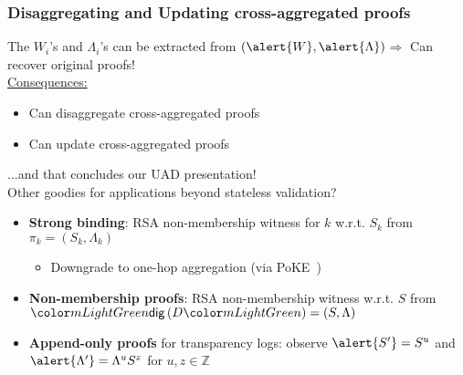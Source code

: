 \begin{frame}
    \frametitle{Disaggregating and Updating cross-aggregated proofs}
    The $W_i$'s and $\Lambda_i$'s can be extracted from $(\alert{W},\alert{\Lambda})$\pause\xspace $\Rightarrow$ Can recover original proofs!\pause\\
    \vspace{1em}
    \underline{Consequences:}\pause
    \begin{itemize}
        \item Can disaggregate cross-aggregated proofs\pause
        \item Can update cross-aggregated proofs\pause
    \end{itemize}
    ...and that concludes our UAD presentation!\pause\\
    \vspace{1em}
    \alert{Other goodies} for applications beyond stateless validation?\pause
    \begin{itemize}
        \item \textbf{Strong binding}\pause: RSA non-membership witness for $k$ w.r.t. $S_k$ from $\pi_k=(S_k, \Lambda_k)$\pause
        \begin{itemize}
            \item Downgrade to one-hop aggregation (via \alert{PoKE}~\cite{BBF18})\pause
        \end{itemize}
        \item \textbf{Non-membership proofs}\pause: RSA non-membership witness w.r.t. $S$ from $\dig{D}=(S,\Lambda)$\pause
        \item \textbf{Append-only proofs} for transparency logs:\pause\xspace observe $\alert{S'} = S^u$ and $\alert{\Lambda'} = \Lambda^u S^z$ for $u,z\in \mathbb{Z}$
    \end{itemize}
\end{frame}